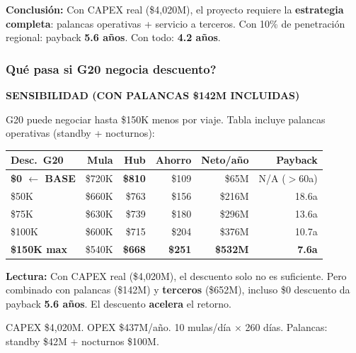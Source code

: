 \documentclass[aspectratio=169, 10pt]{beamer}
\newcommand{\tagline}[2]{{\scriptsize\color{#1}\textbf{\MakeUppercase{#2}}}}
\begin{document}
\begin{frame}
\vspace{6pt}
\colorbox{verdeclaro}{\parbox{\dimexpr\textwidth-12pt}{\scriptsize\strut
\textcolor{verde}{\textbf{Conclusi\'on:}} Con CAPEX real (\$4,020M), el proyecto requiere la \textbf{estrategia completa}:
palancas operativas + servicio a terceros. Con 10\% de penetraci\'on regional: payback \textbf{5.6 a\~nos}.
Con todo: \textbf{4.2 a\~nos}.\strut}}
\end{frame}

\begin{frame}
\frametitle{\textquestiondown Qu\'e pasa si G20 negocia descuento?}
\tagline{verde}{Sensibilidad (con palancas \$142M incluidas)}
\vspace{-2pt}

{\scriptsize G20 puede negociar hasta \$150K menos por viaje. Tabla incluye palancas operativas (standby + nocturnos):}

\vspace{4pt}
\begin{center}
\scriptsize
\renewcommand{\arraystretch}{1.1}
\begin{tabular}{l r r r r r}
    \toprule
    \textbf{Desc.\ G20} & \textbf{Mula} & \textbf{Hub} & \textbf{Ahorro} & \textbf{Neto/a\~no} & \textbf{Payback} \\
    \midrule
    \rowcolor{rojoclaro}
    \textcolor{rojo}{\textbf{\$0 $\leftarrow$ BASE}} & \$720K & \textbf{\$810} & \$109 & \textcolor{amarillo}{\$65M} & N/A ($>$60a) \\
    \$50K & \$660K & \$763 & \$156 & \textcolor{amarillo}{\$216M} & 18.6a \\
    \$75K & \$630K & \$739 & \$180 & \textcolor{amarillo}{\$296M} & 13.6a \\
    \$100K & \$600K & \$715 & \$204 & \textcolor{verde}{\$376M} & 10.7a \\
    \rowcolor{verdeclaro}
    \textcolor{verde}{\textbf{\$150K max}} & \$540K & \textcolor{verde}{\textbf{\$668}} & \textcolor{verde}{\textbf{\$251}} & \textcolor{verde}{\textbf{\$532M}} & \textcolor{verde}{\textbf{7.6a}} \\
    \bottomrule
\end{tabular}
\end{center}

\vspace{4pt}
\colorbox{verdeclaro}{\parbox{\dimexpr\textwidth-12pt}{\scriptsize\strut
\textcolor{verde}{\textbf{Lectura:}} Con CAPEX real (\$4,020M), el descuento solo no es suficiente.
Pero combinado con palancas (\$142M) y \textbf{terceros} (\$652M), incluso \$0 descuento da
payback \textbf{5.6 a\~nos}. El descuento \textbf{acelera} el retorno.\strut}}

\vspace{1pt}
{\tiny\color{gris} CAPEX \$4,020M. OPEX \$437M/a\~no. 10 mulas/d\'ia $\times$ 260 d\'ias. Palancas: standby \$42M + nocturnos \$100M.}
\end{frame}
\end{document}
